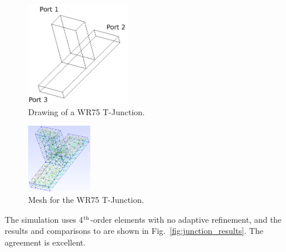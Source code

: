\documentclass[titlepage]{article}
\renewcommand\_{\textunderscore\linebreak[1]}
\begin{document}
\begin{figure}[H]
  \centering
  \includegraphics[width=0.4\textwidth]{../regression/OpenParEM3D/WR75/T-Junction_study/screenshots/junction_drawing}
  \caption{Drawing of a WR75 T-Junction.}
  \label{fig:junction_drawing}
\end{figure}

\begin{figure}[H]
  \centering
  \includegraphics[width=0.25\textwidth]{../regression/OpenParEM3D/WR75/T-Junction_study/screenshots/junction_mesh}
  \caption{Mesh for the WR75 T-Junction.}
  \label{fig:junction_mesh}
\end{figure}

The simulation uses 4$^{\textnormal{th}}$-order elements with no adaptive refinement, and the results and comparisons to \cite{Alessandri} are shown in Fig.~\ref{fig:junction_results}. The agreement is excellent.
\end{document}
